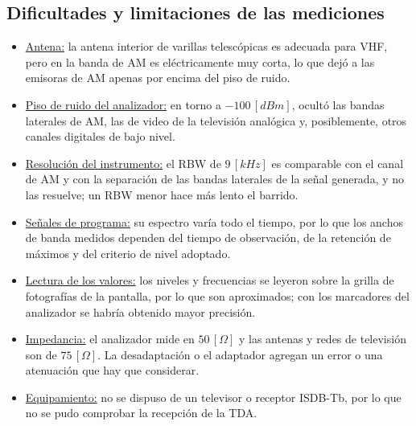 \subsection{Dificultades y limitaciones de las mediciones}
\begin{itemize}
    \item \underline{Antena:} la antena interior de varillas telescópicas es adecuada para VHF, pero en la banda de AM es eléctricamente muy corta, lo que dejó a las emisoras de AM apenas por encima del piso de ruido.
    \item \underline{Piso de ruido del analizador:} en torno a $-100 \, [dBm]$, ocultó las bandas laterales de AM, las de video de la televisión analógica y, posiblemente, otros canales digitales de bajo nivel.
    \item \underline{Resolución del instrumento:} el RBW de $9 \, [kHz]$ es comparable con el canal de AM y con la separación de las bandas laterales de la señal generada, y no las resuelve; un RBW menor hace más lento el barrido.
    \item \underline{Señales de programa:} su espectro varía todo el tiempo, por lo que los anchos de banda medidos dependen del tiempo de observación, de la retención de máximos y del criterio de nivel adoptado.
    \item \underline{Lectura de los valores:} los niveles y frecuencias se leyeron sobre la grilla de fotografías de la pantalla, por lo que son aproximados; con los marcadores del analizador se habría obtenido mayor precisión.
    \item \underline{Impedancia:} el analizador mide en $50 \, [\Omega]$ y las antenas y redes de televisión son de $75 \, [\Omega]$. La desadaptación o el adaptador agregan un error o una atenuación que hay que considerar.
    \item \underline{Equipamiento:} no se dispuso de un televisor o receptor ISDB-Tb, por lo que no se pudo comprobar la recepción de la TDA.
\end{itemize}
